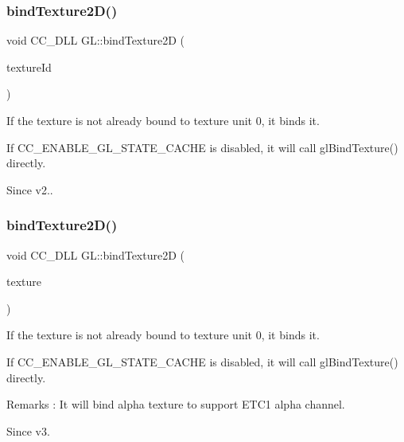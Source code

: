 \subsubsection{\texorpdfstring{bind\+Texture2\+D()}{bindTexture2D()}\hspace{0.1cm}{\footnotesize\ttfamily [1/2]}}
{\footnotesize\ttfamily void C\+C\+\_\+\+D\+LL G\+L\+::bind\+Texture2D (\begin{DoxyParamCaption}\item[{G\+Luint}]{texture\+Id }\end{DoxyParamCaption})}

If the texture is not already bound to texture unit 0, it binds it.

If C\+C\+\_\+\+E\+N\+A\+B\+L\+E\+\_\+\+G\+L\+\_\+\+S\+T\+A\+T\+E\+\_\+\+C\+A\+C\+HE is disabled, it will call gl\+Bind\+Texture() directly. \begin{DoxySince}{Since}
v2.. 
\end{DoxySince}
\mbox{\label{group__renderer_gaf0a8334fdbf6291ae3fac1ac005d60b7}} 
\subsubsection{\texorpdfstring{bind\+Texture2\+D()}{bindTexture2D()}\hspace{0.1cm}{\footnotesize\ttfamily [2/2]}}
{\footnotesize\ttfamily void C\+C\+\_\+\+D\+LL G\+L\+::bind\+Texture2D (\begin{DoxyParamCaption}\item[{\hyperlink{classTexture2D}{Texture2D} $\ast$}]{texture }\end{DoxyParamCaption})}

If the texture is not already bound to texture unit 0, it binds it.

If C\+C\+\_\+\+E\+N\+A\+B\+L\+E\+\_\+\+G\+L\+\_\+\+S\+T\+A\+T\+E\+\_\+\+C\+A\+C\+HE is disabled, it will call gl\+Bind\+Texture() directly.

\begin{DoxyRemark}{Remarks}
\+: It will bind alpha texture to support E\+T\+C1 alpha channel. 
\end{DoxyRemark}
\begin{DoxySince}{Since}
v3. 
\end{DoxySince}
\mbox{\label{group__renderer_gac77f4d272961392154fad22ab2801797}} 

